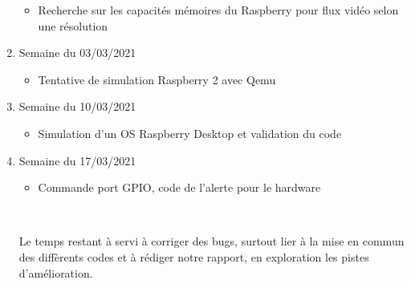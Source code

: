 \documentclass[a4paper]{report}
\begin{document}
\begin{enumerate}
\begin{itemize}
                \item Recherche sur les capacités mémoires du Raspberry pour flux vidéo selon une résolution
            \end{itemize}
        \item Semaine du 03/03/2021
            \begin{itemize}
                \item Tentative de simulation Raspberry 2 avec Qemu
            \end{itemize}
        \item Semaine du 10/03/2021
            \begin{itemize}
                \item Simulation d'un OS Raspberry Desktop et validation du code
            \end{itemize}
        \item Semaine du 17/03/2021
            \begin{itemize}
                \item Commande port GPIO, code de l'alerte pour le hardware
            \end{itemize} \

        Le temps restant à servi à corriger des bugs, surtout lier à la mise en commun 
        des diffèrents codes et à rédiger notre rapport, en exploration les pistes d'amélioration.
    \end{enumerate}

    
    
\end{document}
